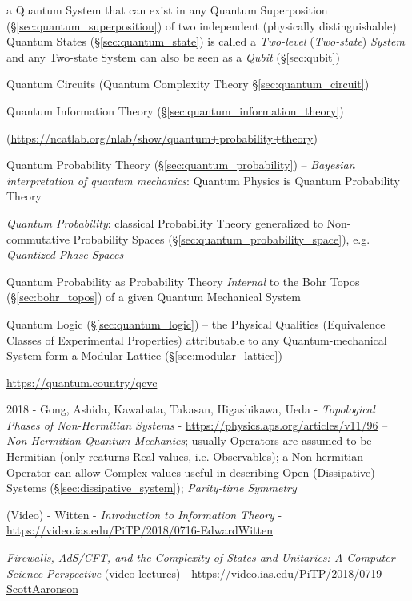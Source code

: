 
a Quantum System that can exist in any Quantum Superposition
(\S\ref{sec:quantum_superposition}) of two independent (physically
distinguishable) Quantum States (\S\ref{sec:quantum_state}) is called a
\emph{Two-level} (\emph{Two-state}) \emph{System} and any Two-state System can
also be seen as a \emph{Qubit} (\S\ref{sec:qubit})

Quantum Circuits (Quantum Complexity Theory \S\ref{sec:quantum_circuit})

Quantum Information Theory (\S\ref{sec:quantum_information_theory})

(\url{https://ncatlab.org/nlab/show/quantum+probability+theory})

Quantum Probability Theory (\S\ref{sec:quantum_probability}) -- \emph{Bayesian
  interpretation of quantum mechanics}: Quantum Physics is Quantum Probability
Theory

\emph{Quantum Probability}: classical Probability Theory generalized to
Non-commutative Probability Spaces (\S\ref{sec:quantum_probability_space}), e.g.
\emph{Quantized Phase Spaces}

Quantum Probability as Probability Theory \emph{Internal} to the Bohr Topos
(\S\ref{sec:bohr_topos}) of a given Quantum Mechanical System

Quantum Logic (\S\ref{sec:quantum_logic}) -- the Physical Qualities (Equivalence
Classes of Experimental Properties) attributable to any Quantum-mechanical
System form a Modular Lattice (\S\ref{sec:modular_lattice})

\url{https://quantum.country/qcvc}

2018 - Gong, Ashida, Kawabata, Takasan, Higashikawa, Ueda -
\emph{Topological Phases of Non-Hermitian Systems} -
\url{https://physics.aps.org/articles/v11/96} -- \emph{Non-Hermitian Quantum
  Mechanics}; usually Operators are assumed to be Hermitian (only reaturns Real
values, i.e. Observables); a Non-hermitian Operator can allow Complex values
useful in describing Open (Dissipative) Systems
(\S\ref{sec:dissipative_system}); \emph{Parity-time Symmetry}

(Video) - Witten - \emph{Introduction to Information Theory} -
\url{https://video.ias.edu/PiTP/2018/0716-EdwardWitten}

\asterism

\emph{Firewalls, AdS/CFT, and the Complexity of States and Unitaries: A Computer
  Science Perspective}
(video lectures)
-
\url{https://video.ias.edu/PiTP/2018/0719-ScottAaronson}

